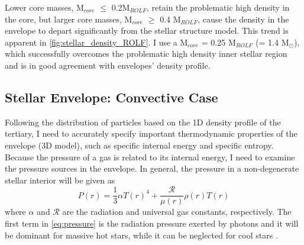 Lower core masses, M$_{core}$ $\leq$ 0.2M$_{ROLF}$, retain the problematic high density in the core, but larger core masses, M$_{core}$ $\geq$ 0.4 M$_{ROLF}$, cause the density in the envelope to depart significantly from the stellar structure model. This trend is apparent in \cref{fig:stellar_density_ROLF}. I use a M$_{core}$ = 0.25 M$_{ROLF}$ (= 1.4 M$_{\odot}$), which successfully overcomes the problematic high density inner stellar region and is in good agreement with envelopes' density profile.

\subsection{Stellar Envelope: Convective Case}\label{sub:envelope}

Following the distribution of particles based on the 1D density profile of the tertiary, I need to accurately specify important thermodynamic properties of the envelope (3D model), such as specific internal energy and specific entropy. Because the pressure of a gas is related to its internal energy, I need to examine the pressure sources in the envelope. In general, the pressure in a non-degenerate stellar interior will be given as 
\begin{equation}\label{eq:pressure}
    P(r) = \frac{1}{3} \alpha T(r)^4+ \frac{\mathcal{R}}{\mu(r)} \rho(r) T(r)
\end{equation}
where $\alpha$ and $\mathcal{R}$ are the radiation and universal gas constants, respectively. The first term in \cref{eq:pressure} is the radiation pressure exerted by photons and it will be dominant for massive hot stars, while it can be neglected for cool stars \citep{pols2011stellar}.

